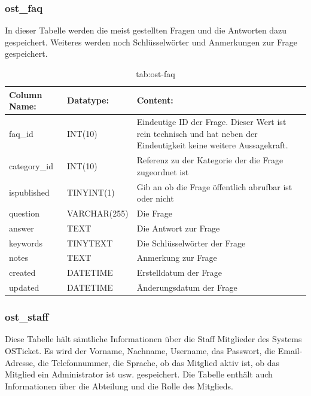 \subsubsection{ost\_faq}

In dieser Tabelle werden die meist gestellten Fragen und die Antworten dazu gespeichert. Weiteres werden noch Schlüsselwörter und Anmerkungen zur Frage gespeichert.

\begin{table}[h]
	\begin{tabular}{|p{3cm}|p{4cm}|p{7.7cm}|}
		\hline
		\textbf{Column Name:} & \textbf{Datatype:} & \textbf{Content:}\\
		\hline
		faq\_id & INT(10) & Eindeutige ID der Frage. Dieser Wert ist rein technisch und hat  neben der Eindeutigkeit keine weitere 
		Aussagekraft.\\
		\hline
		category\_id & INT(10) & Referenz zu der Kategorie der die Frage zugeordnet ist  \\
		\hline
		ispublished & TINYINT(1) & Gib an ob die Frage öffentlich abrufbar ist oder nicht\\
		\hline
		question & VARCHAR(255) & Die Frage\\
		\hline
		answer & TEXT & Die Antwort zur Frage\\
		\hline
		keywords & TINYTEXT & Die Schlüsselwörter der Frage \\
		\hline
		notes & TEXT & Anmerkung zur Frage\\
		\hline
		created & DATETIME & Erstelldatum der Frage\\
		\hline
		updated & DATETIME & Änderungsdatum der Frage\\
		\hline
	\end{tabular}
	\caption{tab:ost-faq}
\end{table}
\label{tab:ost_faq}

\subsubsection{ost\_staff}

Diese Tabelle hält sämtliche Informationen über die Staff Mitglieder des Systems OSTicket. Es wird der Vorname, Nachname, Username, das Passwort, die Email-Adresse, die Telefonnummer, die Sprache, ob das Mitglied aktiv ist, ob das Mitglied ein Administrator ist usw. gespeichert.
Die Tabelle enthält auch Informationen über die Abteilung und die Rolle des Mitglieds.


